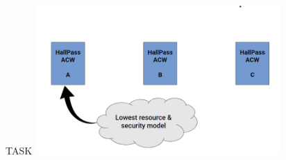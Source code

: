 




\begin{frame}{TASK}
    \centering
    \includegraphics[height=0.7\textheight,width=0.7\textwidth,keepaspectratio]{models.png}
\end{frame}

